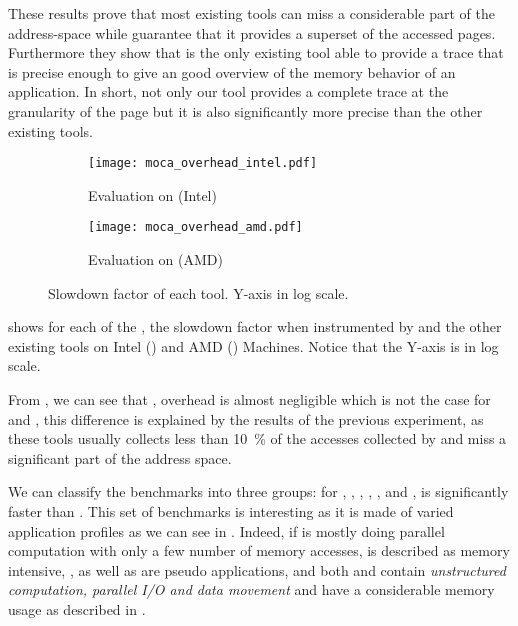 These results prove that most existing tools can miss a considerable part of
the address-space while \Moca guarantee that it provides a superset of the accessed
pages. Furthermore they show that \Moca is the only existing tool able to provide a
trace that is precise enough to give an good overview of the memory behavior of an application. In
short, not only our tool provides a complete trace at the granularity of the
page but it is also significantly more precise than the other existing tools.

\begin{figure}[htb]
    \centering
    \begin{subfigure}{\linewidth}
        \texttt{[image: moca\_overhead\_intel.pdf]}
        \caption{Evaluation on \Edel (Intel)}
        \label{fig:ovh-Intel}
    \end{subfigure}
    \begin{subfigure}{\linewidth}
        \texttt{[image: moca\_overhead\_amd.pdf]}
        \caption{Evaluation on \Stremi (AMD)}
        \label{fig:ovh-AMD}
    \end{subfigure}
    \caption{Slowdown factor of each tool.
    Y-axis in log scale.}
    \label{fig:ovh}
\end{figure}

 shows for each of the \NPB, the slowdown factor when
instrumented by \Moca and the other existing tools on Intel
() and AMD () Machines. Notice that the Y-axis is in
log scale.

From , we can see that \Mitos, \MitosTun overhead is
almost negligible which is not the case for \Moca and \TABARNAC, this
difference is explained by the results of the previous experiment, as these
tools usually collects less than \SI{10}{\%} of the accesses collected by \Moca and
miss a significant part of the address space.

We can classify the benchmarks into three groups:
for \BT, \CG, \DC,  \EP, \LU, \SP and \UA, \Moca is
significantly faster than \TABARNAC. This set of benchmarks is interesting as
it is made of varied application profiles as we can see in .
Indeed, if \EP is mostly doing parallel computation with only a few number of
memory accesses, \CG is described as memory intensive,
\BT, \LU as well as \SP are pseudo applications,
and both \UA and \DC contain \emph{unstructured computation,
parallel I/O and data movement} and \DC have a considerable memory usage as
described in .

